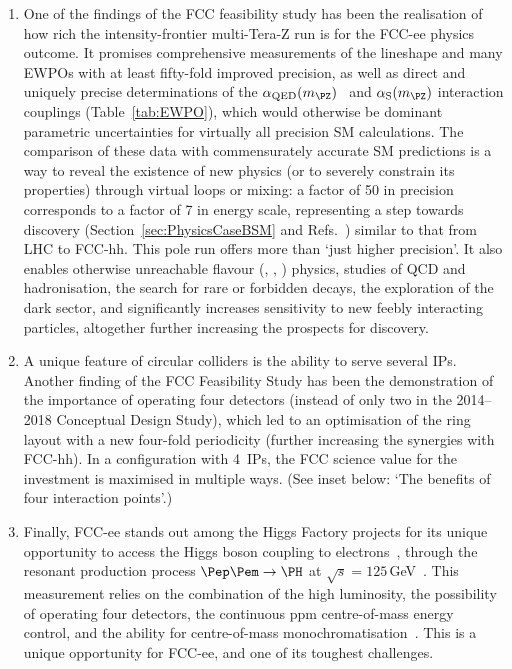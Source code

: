 \begin{enumerate}

\item One of the findings of the FCC feasibility study has been the realisation of how rich the intensity-frontier multi-Tera-Z run is for the FCC-ee physics outcome. 
It promises comprehensive measurements of the \PZ lineshape and many EWPOs with at least fifty-fold improved precision, as well as direct and uniquely precise determinations of the
$\alpha_\text{QED}(m_{\PZ})$~\cite{Janot:2015gjr,Riembau:2025ppc} and $\alpha_\mathrm{S}(m_{\PZ})$ interaction couplings (Table~\ref{tab:EWPO}), which would otherwise be dominant parametric uncertainties for virtually all precision SM calculations. 
The comparison of these data with commensurately accurate SM predictions is a way to reveal the existence of new physics (or to severely constrain its properties) through virtual loops or mixing: a factor of 50 in precision corresponds to a factor of 7 in energy scale, representing a step towards discovery 
(Section~\ref{sec:PhysicsCaseBSM} and Refs.~\cite{Allwicher:2024sso,Gargalionis:2024jaw}) 
similar to that from LHC to FCC-hh.  
This \PZ pole run offers more than `just higher precision'. 
It also enables otherwise unreachable flavour (\PQb, \PQc, \Pgt) physics, studies of QCD and hadronisation, the search for rare or forbidden decays, the exploration of the dark sector, and significantly increases sensitivity to new feebly interacting particles, altogether further increasing the prospects for discovery. 

\item A unique feature of circular colliders is the ability to serve several IPs. Another finding of the FCC Feasibility Study has been the demonstration of the importance of operating four detectors (instead of only two in the 2014--2018 Conceptual Design Study), which led to an optimisation of the ring layout with a new four-fold periodicity 
(further increasing the synergies with FCC-hh). 
In a configuration with 4~IPs, the FCC science value for the investment is maximised in multiple ways. 
(See inset below: `The benefits of four interaction points'.) 

\item Finally, FCC-ee stands out among the Higgs Factory projects for its unique opportunity to access the Higgs boson coupling to electrons~\cite{Ghosh:2015gpa,Dery:2017axi,Altmannshofer:2015qra}, through the resonant production process \mbox{$\Pep\Pem \to \PH$} at $\sqrt{s} = 125$\,GeV~\cite{dEnterria:2021xij}. 
This measurement relies on the combination of the high luminosity, the possibility of operating four detectors, the continuous ppm centre-of-mass energy control, and the ability for centre-of-mass monochromatisation~\cite{FausGolfe2021}. 
This is a unique opportunity for FCC-ee, and one of its toughest challenges. 

\end{enumerate}

